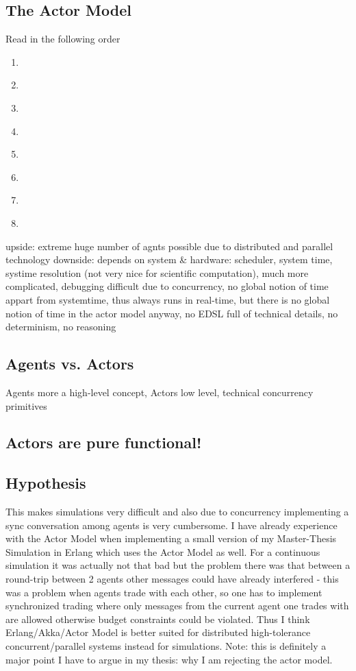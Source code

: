 \subsection{The Actor Model}
Read in the following order


\begin{enumerate}
\item \cite{Hewitt_1973}
\item \cite{Greif_1975}
\item \cite{Clinger_1981}
\item \cite{Agha_1986}
\item \cite{Agha_1997}
\item \cite{Hewitt_2007}
\item \cite{Hewitt_2010}
\item \cite{Agha_2004}
\end{enumerate}

upside: extreme huge number of agnts possible due to distributed and parallel technology 
downside: depends on system \& hardware: scheduler, system time, systime resolution (not very nice for scientific computation), much more complicated, debugging difficult due to concurrency, no global notion of time appart from systemtime, thus always runs in real-time, but there is no global notion of time in the actor model anyway, no EDSL full of technical details, no determinism, no reasoning

\subsection{Agents vs. Actors}
Agents more a high-level concept, Actors low level, technical concurrency primitives

\subsection{Actors are pure functional!}

\subsection{Hypothesis}
This makes simulations very difficult and also due to concurrency implementing a sync conversation among agents is very cumbersome. I have already experience with the Actor Model when implementing a small version of my Master-Thesis Simulation in Erlang which uses the Actor Model as well. For a continuous simulation it was actually not that bad but the problem there was that between a round-trip between 2 agents other messages could have already interfered - this was a problem when agents trade with each other, so one has to implement synchronized trading where only messages from the current agent one trades with are allowed otherwise budget constraints could be violated. Thus I think Erlang/Akka/Actor Model is better suited for distributed high-tolerance concurrent/parallel systems instead for simulations. Note: this is definitely a major point I have to argue in my thesis: why I am rejecting the actor model.

